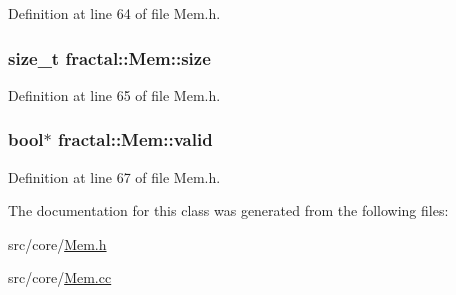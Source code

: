 Definition at line 64 of file Mem.\+h.

\hypertarget{classfractal_1_1Mem_a4bddc66ce0aa9b7a58418645f840f537}{
\subsubsection[{size}]{\setlength{\rightskip}{0pt plus 5cm}size\+\_\+t fractal\+::\+Mem\+::size\hspace{0.3cm}{\ttfamily [protected]}}}\label{classfractal_1_1Mem_a4bddc66ce0aa9b7a58418645f840f537}


Definition at line 65 of file Mem.\+h.

\hypertarget{classfractal_1_1Mem_a1042b8d79e8e6e141aac6c0ddf6677d3}{
\subsubsection[{valid}]{\setlength{\rightskip}{0pt plus 5cm}bool$\ast$ fractal\+::\+Mem\+::valid\hspace{0.3cm}{\ttfamily [protected]}}}\label{classfractal_1_1Mem_a1042b8d79e8e6e141aac6c0ddf6677d3}


Definition at line 67 of file Mem.\+h.



The documentation for this class was generated from the following files\+:\begin{DoxyCompactItemize}
\item 
src/core/\hyperlink{Mem_8h}{Mem.\+h}\item 
src/core/\hyperlink{Mem_8cc}{Mem.\+cc}\end{DoxyCompactItemize}
